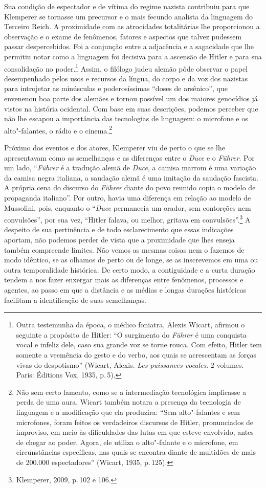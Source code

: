 Sua condição de espectador e de vítima do regime nazista contribuiu para
que Klemperer se tornasse um precursor e o mais fecundo analista da
linguagem do Terceiro Reich. A proximidade com as atrocidades
totalitárias lhe proporcionou a observação e o exame de fenômenos,
fatores e aspectos que talvez pudessem passar despercebidos. Foi a
conjunção entre a adjacência e a sagacidade que lhe permitiu notar como
a linguagem foi decisiva para a ascensão de Hitler e para sua
consolidação no poder.\footnote{Outra testemunha da época, o médico
  foniatra, Alexis Wicart, afirmou o seguinte a propósito de Hitler: ``O
  surgimento do \emph{Führer} é uma conquista vocal e infeliz dele, caso
  sua grande voz se torne rouca. Com efeito, Hitler tem somente a
  veemência do gesto e do verbo, aos quais se acrescentam as forças
  vivas do despotismo'' (Wicart, Alexis. \emph{Les puissances vocales}.
  2 volumes. Paris: Éditions Vox, 1935, p.\,5).} Assim, o filólogo judeu
alemão pôde observar o papel desempenhado pelos usos e recursos da
língua, do corpo e da voz dos nazistas para introjetar as minúsculas e
poderosíssimas ``doses de arsênico'', que envenenou boa parte dos
alemães e tornou possível um dos maiores genocídios já vistos na
história ocidental. Com base em suas descrições, podemos perceber que
não lhe escapou a importância das tecnologias de linguagem: o microfone
e os alto"-falantes, o rádio e o cinema.\footnote{Não sem certo lamento,
  como se a intermediação tecnológica implicasse a perda de uma aura,
  Wicart também notara a presença da tecnologia de linguagem e a
  modificação que ela produzira: ``Sem alto"-falantes e sem microfones,
  foram feitos os verdadeiros discursos de Hitler, pronunciados de
  improviso, em meio às dificuldades das lutas em que esteve envolvido,
  antes de chegar ao poder. Agora, ele utiliza o alto"-falante e o
  microfone, em circunstâncias específicas, nas quais se encontra diante
  de multidões de mais de 200.000 espectadores'' (Wicart, 1935, p.\,125).}

Próximo dos eventos e dos atores, Klemperer viu de perto o que se lhe
apresentavam como as semelhanças e as diferenças entre o \emph{Duce} e o
\emph{Führer}. Por um lado, ``\emph{Führer} é a tradução alemã de
\emph{Duce}, a camisa marrom é uma variação da camisa negra italiana, a
saudação alemã é uma imitação da saudação fascista. A própria cena do
discurso do \emph{Führer} diante do povo reunido copia o modelo de
propaganda italiano''. Por outro, havia uma diferença em relação ao
modelo de Mussolini, pois, enquanto o ``\emph{Duce} permanecia um
orador, sem contorções nem convulsões'', por sua vez, ``Hitler falava,
ou melhor, gritava em convulsões''.\footnote{Klemperer, 2009, p.\,102 e
  106.} A despeito de sua pertinência e de todo esclarecimento que
essas indicações aportam, não podemos perder de vista que a proximidade
que lhes enseja também compreende limites. Não vemos as mesmas coisas
nem o fazemos de modo idêntico, se as olhamos de perto ou de longe, se
as inscrevemos em uma ou outra temporalidade histórica. De certo modo, a
contiguidade e a curta duração tendem a nos fazer enxergar mais as
diferenças entre fenômenos, processos e agentes, ao passo em que a
distância e as médias e longas durações históricas facilitam a
identificação de suas semelhanças.

